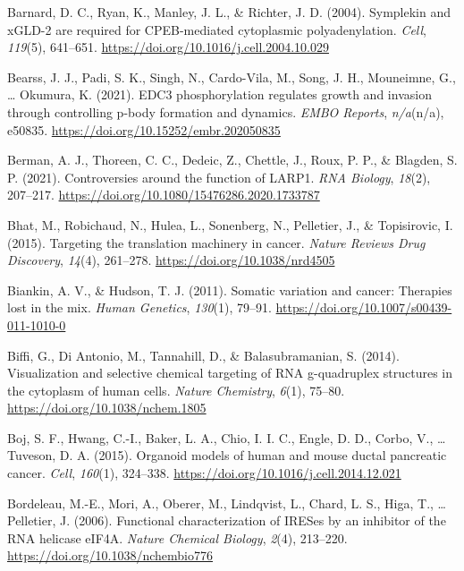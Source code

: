 \documentclass[12pt,openany]{book}
\begin{document}
\hypertarget{ref-Barnard2004}{}
Barnard, D. C., Ryan, K., Manley, J. L., \& Richter, J. D. (2004).
Symplekin and xGLD-2 are required for CPEB-mediated cytoplasmic
polyadenylation. \emph{Cell}, \emph{119}(5), 641--651.
\url{https://doi.org/10.1016/j.cell.2004.10.029}

\hypertarget{ref-Bearss2021}{}
Bearss, J. J., Padi, S. K., Singh, N., Cardo-Vila, M., Song, J. H.,
Mouneimne, G., \ldots{} Okumura, K. (2021). EDC3 phosphorylation
regulates growth and invasion through controlling p-body formation and
dynamics. \emph{EMBO Reports}, \emph{n/a}(n/a), e50835.
\url{https://doi.org/10.15252/embr.202050835}

\hypertarget{ref-Berman2021}{}
Berman, A. J., Thoreen, C. C., Dedeic, Z., Chettle, J., Roux, P. P., \&
Blagden, S. P. (2021). Controversies around the function of LARP1.
\emph{RNA Biology}, \emph{18}(2), 207--217.
\url{https://doi.org/10.1080/15476286.2020.1733787}

\hypertarget{ref-Bhat2015}{}
Bhat, M., Robichaud, N., Hulea, L., Sonenberg, N., Pelletier, J., \&
Topisirovic, I. (2015). Targeting the translation machinery in cancer.
\emph{Nature Reviews Drug Discovery}, \emph{14}(4), 261--278.
\url{https://doi.org/10.1038/nrd4505}

\hypertarget{ref-Biankin2011}{}
Biankin, A. V., \& Hudson, T. J. (2011). Somatic variation and cancer:
Therapies lost in the mix. \emph{Human Genetics}, \emph{130}(1), 79--91.
\url{https://doi.org/10.1007/s00439-011-1010-0}

\hypertarget{ref-Biffi2014}{}
Biffi, G., Di Antonio, M., Tannahill, D., \& Balasubramanian, S. (2014).
Visualization and selective chemical targeting of RNA g-quadruplex
structures in the cytoplasm of human cells. \emph{Nature Chemistry},
\emph{6}(1), 75--80. \url{https://doi.org/10.1038/nchem.1805}

\hypertarget{ref-Boj2015}{}
Boj, S. F., Hwang, C.-I., Baker, L. A., Chio, I. I. C., Engle, D. D.,
Corbo, V., \ldots{} Tuveson, D. A. (2015). Organoid models of human and
mouse ductal pancreatic cancer. \emph{Cell}, \emph{160}(1), 324--338.
\url{https://doi.org/10.1016/j.cell.2014.12.021}

\hypertarget{ref-Bordeleau2006}{}
Bordeleau, M.-E., Mori, A., Oberer, M., Lindqvist, L., Chard, L. S.,
Higa, T., \ldots{} Pelletier, J. (2006). Functional characterization of
IRESes by an inhibitor of the RNA helicase eIF4A. \emph{Nature Chemical
Biology}, \emph{2}(4), 213--220.
\url{https://doi.org/10.1038/nchembio776}
\end{document}
